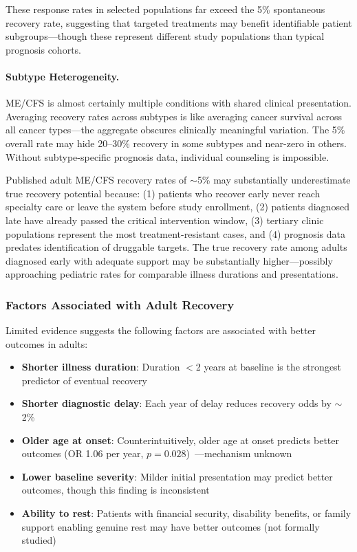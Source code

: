 These response rates in selected populations far exceed the 5\% spontaneous recovery rate, suggesting that targeted treatments may benefit identifiable patient subgroups---though these represent different study populations than typical prognosis cohorts.

\paragraph{Subtype Heterogeneity.}
ME/CFS is almost certainly multiple conditions with shared clinical presentation. Averaging recovery rates across subtypes is like averaging cancer survival across all cancer types---the aggregate obscures clinically meaningful variation. The 5\% overall rate may hide 20--30\% recovery in some subtypes and near-zero in others. Without subtype-specific prognosis data, individual counseling is impossible.

\begin{hypothesis}
\label{hyp:selection-bias-recovery}
Published adult ME/CFS recovery rates of $\sim$5\% may substantially underestimate true recovery potential because: (1) patients who recover early never reach specialty care or leave the system before study enrollment, (2) patients diagnosed late have already passed the critical intervention window, (3) tertiary clinic populations represent the most treatment-resistant cases, and (4) prognosis data predates identification of druggable targets. The true recovery rate among adults diagnosed early with adequate support may be substantially higher---possibly approaching pediatric rates for comparable illness durations and presentations.
\end{hypothesis}

\subsubsection{Factors Associated with Adult Recovery}

Limited evidence suggests the following factors are associated with better outcomes in adults:

\begin{itemize}
    \item \textbf{Shorter illness duration}: Duration $<$2 years at baseline is the strongest predictor of eventual recovery
    \item \textbf{Shorter diagnostic delay}: Each year of delay reduces recovery odds by $\sim$2\%
    \item \textbf{Older age at onset}: Counterintuitively, older age at onset predicts better outcomes (OR 1.06 per year, $p = 0.028$)~\cite{Lacourt2022prognosis}---mechanism unknown
    \item \textbf{Lower baseline severity}: Milder initial presentation may predict better outcomes, though this finding is inconsistent
    \item \textbf{Ability to rest}: Patients with financial security, disability benefits, or family support enabling genuine rest may have better outcomes (not formally studied)
\end{itemize}

